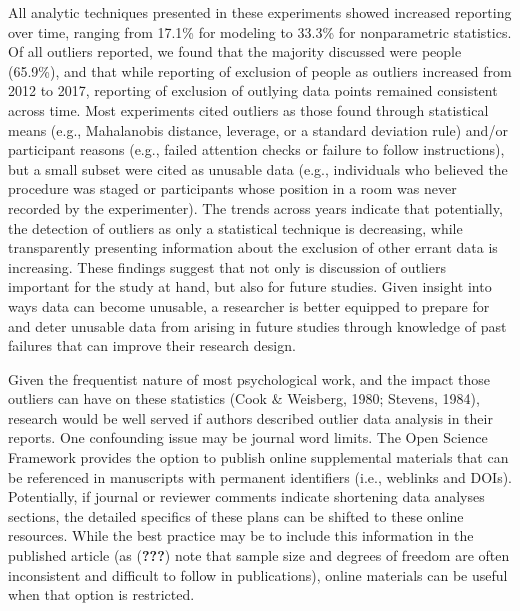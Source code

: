 \documentclass[english,,man,mask]{apa6}
\theoremstyle{definition}
\theoremstyle{definition}
\theoremstyle{definition}
\theoremstyle{remark}
\begin{document}
All analytic techniques presented in these experiments showed increased
reporting over time, ranging from 17.1\% for modeling to 33.3\% for
nonparametric statistics. Of all outliers reported, we found that the
majority discussed were people (65.9\%), and that while reporting of
exclusion of people as outliers increased from 2012 to 2017, reporting
of exclusion of outlying data points remained consistent across time.
Most experiments cited outliers as those found through statistical means
(e.g., Mahalanobis distance, leverage, or a standard deviation rule)
and/or participant reasons (e.g., failed attention checks or failure to
follow instructions), but a small subset were cited as unusable data
(e.g., individuals who believed the procedure was staged or participants
whose position in a room was never recorded by the experimenter). The
trends across years indicate that potentially, the detection of outliers
as only a statistical technique is decreasing, while transparently
presenting information about the exclusion of other errant data is
increasing. These findings suggest that not only is discussion of
outliers important for the study at hand, but also for future studies.
Given insight into ways data can become unusable, a researcher is better
equipped to prepare for and deter unusable data from arising in future
studies through knowledge of past failures that can improve their
research design.

Given the frequentist nature of most psychological work, and the impact
those outliers can have on these statistics (Cook \& Weisberg, 1980;
Stevens, 1984), research would be well served if authors described
outlier data analysis in their reports. One confounding issue may be
journal word limits. The Open Science Framework provides the option to
publish online supplemental materials that can be referenced in
manuscripts with permanent identifiers (i.e., weblinks and DOIs).
Potentially, if journal or reviewer comments indicate shortening data
analyses sections, the detailed specifics of these plans can be shifted
to these online resources. While the best practice may be to include
this information in the published article (as ({\textbf{???}}) note that
sample size and degrees of freedom are often inconsistent and difficult
to follow in publications), online materials can be useful when that
option is restricted.
\end{document}
